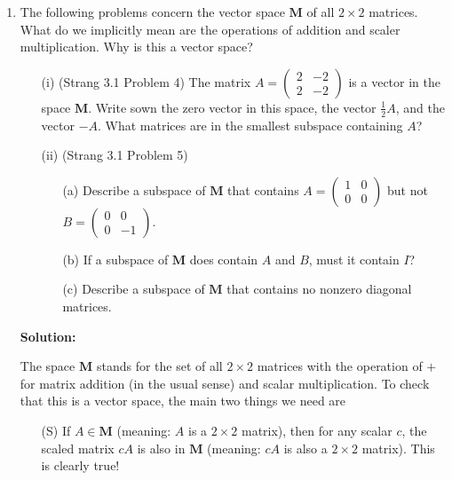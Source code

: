 \documentclass[11pt]{article}
\begin{document}
\begin{enumerate}

\item The following problems concern the vector space $\mathbf{M}$ of all $2 \times 2$ matrices.  What do we implicitly mean are the operations of addition and scaler multiplication.  Why is this a vector space?

\begin{enumerate}

\item[(i)] (Strang 3.1 Problem 4) The matrix $A = \begin{pmatrix} 2 & -2 \\ 2 & -2 \end{pmatrix}$ is a vector in the space $\mathbf{M}$.  Write sown the zero vector in this space, the vector $\frac{1}{2} A$, and the vector $-A$.  What matrices are in the smallest subspace containing $A$?

\item[(ii)] (Strang 3.1 Problem 5) 

\begin{enumerate}

\item[(a)] Describe a subspace of $\mathbf{M}$ that contains $A = \begin{pmatrix} 1 & 0 \\ 0 & 0 \end{pmatrix}$ but not $B = \begin{pmatrix} 0 & 0 \\ 0 & -1 \end{pmatrix}$.

\item[(b)] If a subspace of $\mathbf{M}$ does contain $A$ and $B$, must it contain $I$?

\item[(c)] Describe a subspace of $\mathbf{M}$ that contains no nonzero diagonal matrices.

\end{enumerate}

\end{enumerate}

\textbf{Solution:} 

The space $\mathbf{M}$ stands for the set of all $2 \times 2$ matrices with the operation of $+$ for matrix addition (in the usual sense) and scalar multiplication.  To check that this is a vector space, the main two things we need are

\begin{enumerate}
\item[(S)] If $A  \in \mathbf{M}$ (meaning: $A$ is a $2\times 2$ matrix), then for any scalar $c$, the scaled matrix $c A$ is also in $\mathbf{M}$ (meaning: $c A$ is also a $2 \times 2$ matrix).  This is clearly true!


\end{enumerate}
\end{enumerate}
\end{document}
